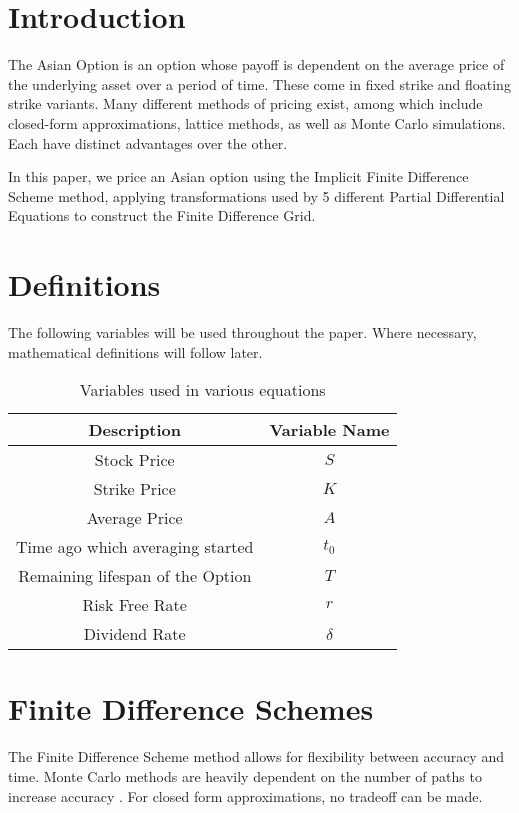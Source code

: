 \documentclass{article}
\begin{document}
\tableofcontents

\newpage

\section{Introduction}

The Asian Option is an option whose payoff is dependent on the average price of the underlying asset over a period of time. These come in fixed strike and floating strike variants. Many different methods of pricing exist, among which include closed-form approximations, lattice methods, as well as Monte Carlo simulations. Each have distinct advantages over the other.

In this paper, we price an Asian option using the Implicit Finite Difference Scheme method, applying transformations used by 5 different Partial Differential Equations to construct the Finite Difference Grid.

\section{Definitions}
The following variables will be used throughout the paper. Where necessary, mathematical definitions will follow later.
\begin{table}[h]
  \begin{tabular}{|c|c|}
    \hline
    \textbf{Description} & \textbf{Variable Name} \\ \hline
    Stock Price & \(S\) \\
    Strike Price & \(K\)\\
    Average Price & \(A\) \\
    Time ago which averaging started & \(t_0\) \\
    Remaining lifespan of the Option & \(T\) \\
    Risk Free Rate & \(r\) \\
    Dividend Rate & \(\delta\) \\
    \hline
  \end{tabular}
  \caption{Variables used in various equations}
  \label{table:name}
\end{table}

\section{Finite Difference Schemes}

The Finite Difference Scheme method allows for flexibility between accuracy and time. Monte Carlo methods are heavily dependent on the number of paths to increase accuracy \cite{montecarlo}. For closed form approximations, no tradeoff can be made.
\end{document}
